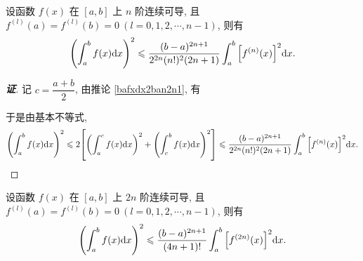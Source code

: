 \begin{inference}
    设函数 $f(x)$ 在 $[a,b]$ 上 $n$ 阶连续可导, 且 $f^{(l)}(a)=f^{(l)}(b)=0~ (l=0,1,2,\cdots,n-1)$, 则有
    $$\qty(\int_{a}^{b}f(x)\dd x)^2\leqslant \dfrac{(b-a)^{2n+1}}{2^{2n}(n!)^2(2n+1)}\int_{a}^{b}\qty[f^{(n)}(x)]^2\dd x.$$
\end{inference}
\begin{proof}[{\songti \textbf{证}}]
    记 $c=\dfrac{a+b}{2}$, 由推论 \ref{bafxdx2ban2n1}, 有
    于是由基本不等式,
    $$\qty(\int_{a}^{b}f(x)\dd x)^2\leqslant 2\qty[\qty(\int_{a}^{c}f(x)\dd x)^2+\qty(\int_{c}^{b}f(x)\dd x)^2]\leqslant \dfrac{(b-a)^{2n+1}}{2^{2n}(n!)^2(2n+1)}\int_{a}^{b}\qty[f^{(n)}(x)]^2\dd x.$$
\end{proof}

\begin{inference}
    设函数 $f(x)$ 在 $[a,b]$ 上 $2n$ 阶连续可导, 且 $f^{(l)}(a)=f^{(l)}(b)=0~ (l=0,1,2,\cdots,n-1)$, 则有
    $$\qty(\int_{a}^{b}f(x)\dd x)^2\leqslant\dfrac{(b-a)^{2n+1}}{(4n+1)!}\int_{a}^{b}\qty[f^{(2n)}(x)]^2\dd x.$$
\end{inference}

